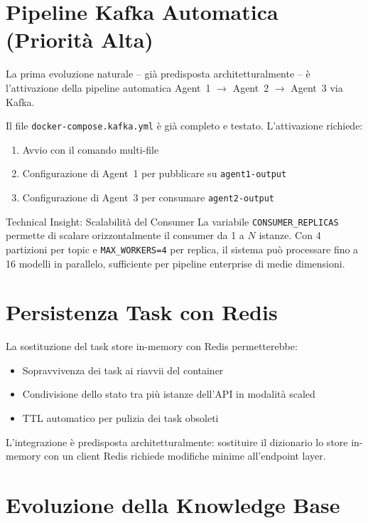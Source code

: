 \documentclass[12pt,a4paper]{report}
\begin{document}
\section{Pipeline Kafka Automatica (Priorità Alta)}

La prima evoluzione naturale -- già predisposta architetturalmente -- è l'attivazione
della pipeline automatica Agent~1 $\rightarrow$ Agent~2 $\rightarrow$ Agent~3
via Kafka.

Il file \texttt{docker-compose.kafka.yml} è già completo e testato. L'attivazione
richiede:
\begin{enumerate}
  \item Avvio con il comando multi-file
  \item Configurazione di Agent~1 per pubblicare su \texttt{agent1-output}
  \item Configurazione di Agent~3 per consumare \texttt{agent2-output}
\end{enumerate}

\begin{technicalbox}{Technical Insight: Scalabilità del Consumer}
La variabile \texttt{CONSUMER\_REPLICAS} permette di scalare orizzontalmente
il consumer da 1 a $N$ istanze. Con 4 partizioni per topic e
\texttt{MAX\_WORKERS=4} per replica, il sistema può processare fino a 16 modelli
in parallelo, sufficiente per pipeline enterprise di medie dimensioni.
\end{technicalbox}

\section{Persistenza Task con Redis}

La sostituzione del task store in-memory con Redis permetterebbe:
\begin{itemize}
  \item Sopravvivenza dei task ai riavvii del container
  \item Condivisione dello stato tra più istanze dell'API in modalità scaled
  \item TTL automatico per pulizia dei task obsoleti
\end{itemize}
L'integrazione è predisposta architetturalmente: sostituire il dizionario
lo store in-memory con un client Redis richiede modifiche minime all'endpoint layer.
\section{Evoluzione della Knowledge Base}
\end{document}
